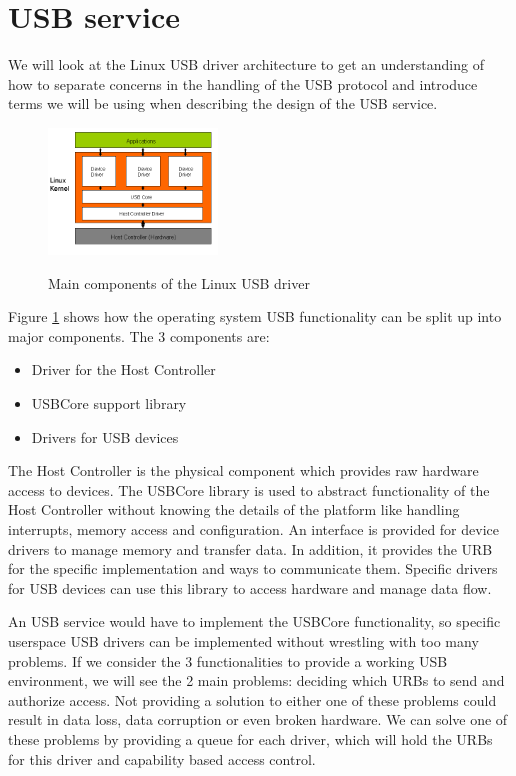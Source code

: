 \documentclass{acm_proc_article-sp}
\begin{document}
\section{USB service}
\label{sec:serv}
We will look at the Linux USB driver architecture to get an understanding of how to separate concerns
in the handling of the USB protocol and introduce terms we will be using when describing the design
of the USB service.
\begin{figure}[!h]
\centering
\includegraphics[width=0.4\textwidth]{usblinux.png}
\label{fig:usblinux}
\caption{Main components of the Linux USB driver}
\end{figure}
Figure \ref{fig:usblinux} shows how the operating system USB functionality can be split up into
major components.
The 3 components are:
\begin{itemize}
\item Driver for the Host Controller
\item USBCore support library
\item Drivers for USB devices
\end{itemize}
The Host Controller is the physical component which provides raw hardware access to devices.
The USBCore library is used to abstract functionality of the Host Controller without knowing
the details of the platform like handling interrupts, memory access and configuration.
An interface is provided for device drivers to manage memory and transfer data.
In addition, it provides the URB for the specific implementation and ways to communicate them.
Specific drivers for USB devices can use this library to access hardware and manage data flow.

An USB service would have to implement the USBCore functionality, so specific userspace
USB drivers can be implemented without wrestling with too many problems.
If we consider the 3 functionalities to provide a working USB environment, we will see the 2
main problems: deciding which URBs to send and authorize access.
Not providing a solution to either one of these problems could result in data loss,
data corruption or even broken hardware.
We can solve one of these problems by providing a queue for each driver, which will hold the URBs
for this driver and capability based access control.
\end{document}
